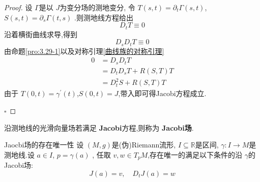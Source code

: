 \documentclass[../../几何与拓扑.tex]{subfiles}
\begin{document}
\begin{proof}
    设 \(   \Gamma   \)是以  \(  J  \)为变分场的测地变分,  令 \(  T \left( s,t \right) =   \partial _{t} \Gamma \left( s,t \right)   \),\(  S\left( s,t \right)=  \partial _{s} \Gamma \left( t,s \right)    \) .则测地线方程给出 \[
    D_{t}T\equiv 0
    \] 沿着横街曲线求导,得到 \[
    D_{s}D_{t}T\equiv 0
    \] 由命题\ref{pro:3.29-1}以及对称引理\ref{曲线族的对称引理} \[
    \begin{aligned}
    0& = D_{s}D_{t}T\\ 
     & = D_{t}D_{s}T+  R\left( S,T \right)T  \\ 
      & = D_{t}^{2}S+ R\left( S,T \right)T 
    \end{aligned}
    \]由于 \(  T\left( 0,t \right)=  \gamma ^{\prime} \left( t \right)    \),\(  S\left( 0,t \right)= J   \),带入即可得Jacobi方程成立.  

    \hfill $\square$
\end{proof}
\begin{definition}
    沿测地线的光滑向量场若满足 \textbf{Jacobi}方程,则称为 \textbf{Jacobi场}.
\end{definition}

\begin{theorem}{Jaocbi场的存在唯一性}
    设 \(  \left( M,g \right)   \)是(伪)Riemann流形, \(  I\subseteq \mathbb{R}   \)是区间, \(   \gamma :I\to M  \)是测地线.设 \(  a \in I  \), \(  p=  \gamma \left( a \right)   \) ,     任取 \(  v,w \in T_{p}M  \),存在唯一的满足以下条件的沿 \(   \gamma   \)的Jacobi场:  \[
    J\left( a \right)= v,\quad D_{t}J\left( a \right)= w  
    \]  
\end{theorem}
\end{document}
